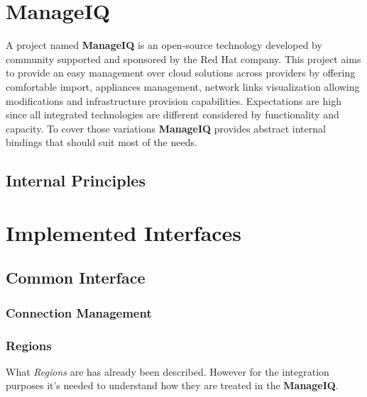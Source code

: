 \chapter{ManageIQ}
\label{chap:ManageIQ}

A project named \textbf{ManageIQ} is an open-source technology developed by community supported and sponsored by the Red Hat company. This project aims to provide an easy management over cloud solutions across providers by offering comfortable import, appliances management, network links visualization allowing modifications and infrastructure provision capabilities. Expectations are high since all integrated technologies are different considered by functionality and capacity. To cover those variations \textbf{ManageIQ} provides abstract internal bindings that should suit most of the needs.

\section{Internal Principles}
\label{sec:Internal Principles}



\chapter{Implemented Interfaces}
\label{chap:Implemented Interfaces}


\section{Common Interface}
\label{sec:Common Interface}


\subsection{Connection Management}
\label{sub:Connection Management}


\subsection{Regions}
\label{sub:Regions}

What \emph{Regions} are has already been described. However for the integration purposes it's needed to understand how they are treated in the \textbf{ManageIQ}.

